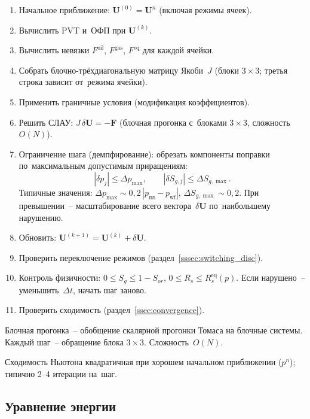 \documentclass[12pt,a4paper]{article}
\newcommand{\ppl}{p_{\text{пл}}}
\newcommand{\pwf}{p_{\mathrm{wf}}}
\begin{document}
\begin{enumerate}[nosep]
  \item Начальное приближение:
        $\mathbf{U}^{(0)} = \mathbf{U}^n$ (включая режимы ячеек).
  \item Вычислить PVT и~ОФП при $\mathbf{U}^{(k)}$.
  \item Вычислить невязки $F^{\text{oil}}$, $F^{\text{gas}}$,
        $F^{\text{eq}}$ для каждой ячейки.
  \item Собрать блочно-трёхдиагональную матрицу Якоби~$J$
        (блоки $3\times 3$; третья строка зависит от~режима ячейки).
  \item Применить граничные условия (модификация коэффициентов).
  \item Решить СЛАУ: $J\,\delta\mathbf{U} = -\mathbf{F}$
        (блочная прогонка с~блоками $3\times 3$, сложность~$O(N)$).
  \item Ограничение шага (демпфирование): обрезать компоненты
        поправки по~максимальным допустимым приращениям:
        \[
          |\delta p_j| \leqslant \Delta p_{\max},
          \qquad
          |\delta S_{g,j}| \leqslant \Delta S_{g,\max}.
        \]
        Типичные значения: $\Delta p_{\max} \sim 0{,}2\,|\ppl - \pwf|$,
        $\Delta S_{g,\max} \sim 0{,}2$.
        При превышении~-- масштабирование всего вектора~$\delta\mathbf{U}$
        по~наибольшему нарушению.
  \item Обновить: $\mathbf{U}^{(k+1)} = \mathbf{U}^{(k)} + \delta\mathbf{U}$.
  \item Проверить переключение режимов
        (раздел~\ref{sssec:switching_disc}).
  \item Контроль физичности: $0 \leqslant S_g \leqslant 1 - S_{or}$,
        $0 \leqslant R_s \leqslant R_s^{\text{eq}}(p)$.
        Если нарушено~-- уменьшить~$\Delta t$, начать шаг заново.
  \item Проверить сходимость (раздел~\ref{ssec:convergence}).
\end{enumerate}

Блочная прогонка~-- обобщение скалярной прогонки Томаса на блочные
системы. Каждый шаг~-- обращение блока $3\times 3$. Сложность~$O(N)$.

Сходимость Ньютона квадратичная при хорошем начальном приближении
($p^n$); типично 2--4 итерации на~шаг.


\subsection{Уравнение энергии}\label{ssec:energy_disc}
\end{document}
